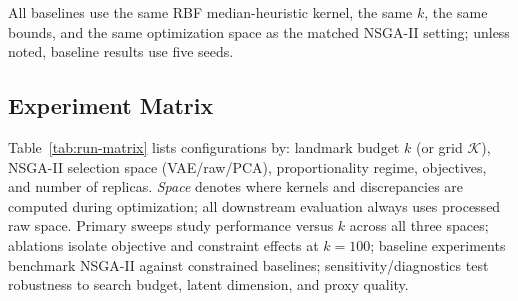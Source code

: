 \documentclass[10pt,journal]{IEEEtran}
\newcommand{\kGrid}{\mathcal{K}}
\newcommand{\1}{\mathbf{1}}
\theoremstyle{ieeethm}
\begin{document}
All baselines use the same RBF median-heuristic kernel, the same $k$, the same bounds, and the same optimization space as the matched NSGA-II setting; unless noted, baseline results use five seeds.

\subsection{Experiment Matrix}
\label{subsec:run_matrix}

Table~\ref{tab:run-matrix} lists configurations by: landmark budget $k$ (or grid $\kGrid$), NSGA-II selection space (VAE/raw/PCA), proportionality regime, objectives, and number of replicas. \emph{Space} denotes where kernels and discrepancies are computed during optimization; all downstream evaluation always uses processed raw space. Primary sweeps study performance versus $k$ across all three spaces; ablations isolate objective and constraint effects at $k=100$; baseline experiments benchmark NSGA-II against constrained baselines; sensitivity/diagnostics test robustness to search budget, latent dimension, and proxy quality.
\end{document}

